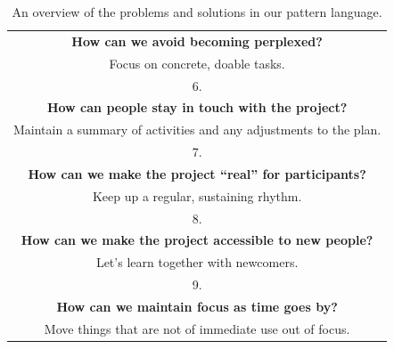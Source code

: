 \begin{refsection}
\begin{table}
{\begin{tabularx}{\textwidth}{|C|}
\vspace{.01em}
\textbf{How can we avoid becoming perplexed?}\\
Focus on concrete, doable tasks.
\vspace{.4em}\\
\hline
\vspace{-.4em} \color{Black} 6. \vspace{.4em}\\
\hline
\vspace{.01em}
\textbf{How can people stay in touch with the project?}\\
Maintain a summary of activities and any adjustments to the plan.
\vspace{.4em}\\
\hline
\vspace{-.4em} \color{Black} 7. \vspace{.4em}\\
\hline
\vspace{.01em}
\textbf{How can we make the project ``real'' for participants?}\\
Keep up a regular, sustaining rhythm.
\vspace{.4em}\\
\hline
\vspace{-.4em} \color{Black} 8. \vspace{.4em}\\
\hline
\vspace{.01em}
\textbf{How can we make the project accessible to new people?}\\
Let's learn together with newcomers.
\vspace{.4em}\\
\hline
\vspace{-.4em} \color{Black} 9. \vspace{.4em}\\
\hline
\vspace{.01em}
\textbf{How can we maintain focus as time goes by?}\\
Move things that are not of immediate use out of focus.
\vspace{.4em}\\
\hline
\end{tabularx}
}
\smallskip
\caption{An overview of the problems and solutions in our pattern language.\label{tab:core}}
\end{table}


\end{refsection}
